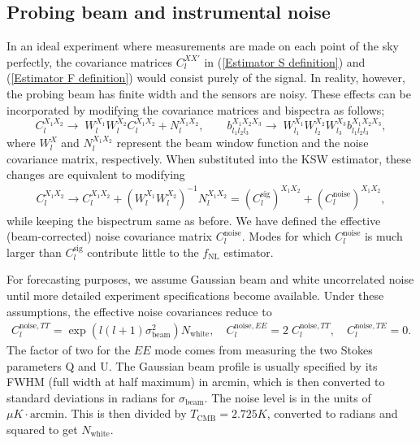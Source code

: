 \subsection{Probing beam and instrumental noise} \label{section:beam_and_noise}

In an ideal experiment where measurements are made on each point of the sky perfectly, the covariance matrices $C_l^{XX'}$ in (\ref{Estimator S definition}) and (\ref{Estimator F definition}) would consist purely of the signal. In reality, however, the probing beam has finite width and the sensors are noisy. These effects can be incorporated by modifying the covariance matrices and bispectra as follows;
\begin{equation}
	C_l^{X_1 X_2} \rightarrow\; W_l^{X_1} W_l^{X_2} C_l^{X_1 X_2} + N_l^{X_1 X_2} ,\qquad b_{l_1 l_2 l_3}^{X_1 X_2 X_3} \rightarrow\; W_{l_1}^{X_1} W_{l_2}^{X_2} W_{l_3}^{X_3} b_{l_1 l_2 l_3}^{X_1 X_2 X_3},
\end{equation}
where $W_l^X$ and $N_l^{X_1 X_2}$ represent the beam window function and the noise covariance matrix, respectively. When substituted into the KSW estimator, these changes are equivalent to modifying
\begin{align}
	C_l^{X_1 X_2} \rightarrow C_l^{X_1 X_2} + \left( W_l^{X_1} W_l^{X_2} \right)^{-1} N_l^{X_1 X_2} = ( C_l^\text{sig} )^{X_1 X_2} + ( C_l^\text{noise} )^{X_1 X_2},
\end{align}
while keeping the bispectrum same as before. We have defined the effective (beam-corrected) noise covariance matrix $C_l^\text{noise}$. Modes for which $C_l^\text{noise}$ is much larger than $C_l^\text{sig}$ contribute little to the $f_\text{NL}$ estimator.

For forecasting purposes, we assume Gaussian beam and white uncorrelated noise until more detailed experiment specifications become available. Under these assumptions, the effective noise covariances reduce to \cite{Ng1999}
\begin{eqnarray}
	C_l^{\text{noise}, TT} = \exp\left({l(l+1)\sigma_\text{beam}^2} \right)N_\text{white}, \quad C_l^{\text{noise}, EE} =2\; C_l^{\text{noise}, TT}, \quad C_l^{\text{noise}, TE} = 0.
\end{eqnarray}
The factor of two for the $EE$ mode comes from measuring the two Stokes parameters Q and U. The Gaussian beam profile is usually specified by its FWHM (full width at half maximum) in arcmin, which is then converted to standard deviations in radians for $\sigma_\text{beam}$. The noise level is in the units of $\mu K\cdot \text{arcmin}$. This is then divided by $T_\text{CMB} = 2.725K$, converted to radians and squared to get $N_\text{white}$.

